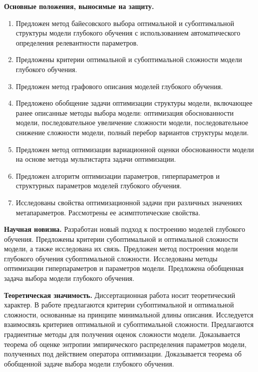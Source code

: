 \documentclass[11pt, a5paper]{dissert}
\theoremstyle{definition}
\begin{document}
\vspace{0.5cm}
\textbf{Основные положения, выносимые на защиту.}
\vspace{0.3cm}
\begin{enumerate}
\item Предложен метод байесовского выбора оптимальной и субоптимальной структуры модели глубокого обучения с использованием автоматического определения
релевантности параметров.
\item Предложены критерии оптимальной и субоптимальной сложности модели глубокого обучения.
\item Предложен метод графового описания моделей глубокого обучения.
\item Предложено обобщение задачи оптимизации структуры модели, включающее ранее описанные методы выбора модели: оптимизация обоснованности модели, последовательное увеличение сложности модели, последовательное снижение сложности модели, полный перебор вариантов структуры модели.
\item Предложен метод оптимизации вариационной оценки обоснованности модели на основе метода мультистарта задачи оптимизации.
\item Предложен алгоритм оптимизации параметров, гиперпараметров и структурных параметров моделей глубокого обучения.
\item Исследованы свойства оптимизационной задачи при различных значениях метапараметров. Рассмотрены ее асимптотические свойства.
\end{enumerate}


\vspace{0.5cm}
\textbf{Научная новизна.} Разработан новый подход к построению моделей глубокого обучения. Предложены критерии субоптимальной и оптимальной сложности модели, а также исследована их связь. Предложен метод построения модели глубокого обучения субоптимальной сложности. Исследованы методы оптимизации гиперпараметров и параметров модели.  Предложена обобщенная задача выбора модели глубокого обучения.

\vspace{0.5cm}
\textbf{Теоретическая значимость.} Диссертационная работа носит теоретический характер. В работе предлагаются критерии субоптимальной и оптимальной сложности, основанные на принципе минимальной длины описания. Исследуется взаимосвязь критериев оптимальной и субоптимальной сложности. Предлагаются градиентные методы для получения оценок сложности модели. Доказывается теорема об оценке энтропии эмпирического распределения параметров модели, полученных под действием оператора оптимизации.
Доказывается теорема об обобщенной задаче выбора модели глубокого обучения.
\end{document}
